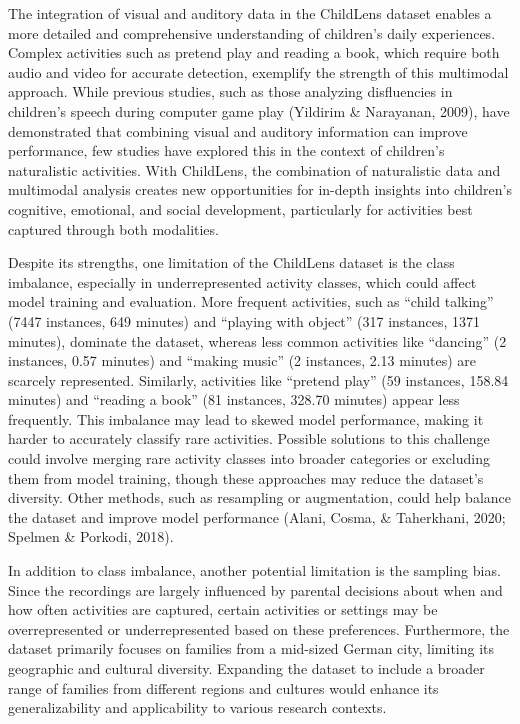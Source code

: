 \documentclass[
  man,floatsintext]{apa6}
\begin{document}
The integration of visual and auditory data in the ChildLens dataset enables a more detailed and comprehensive understanding of children's daily experiences. Complex activities such as pretend play and reading a book, which require both audio and video for accurate detection, exemplify the strength of this multimodal approach. While previous studies, such as those analyzing disfluencies in children's speech during computer game play (Yildirim \& Narayanan, 2009), have demonstrated that combining visual and auditory information can improve performance, few studies have explored this in the context of children's naturalistic activities. With ChildLens, the combination of naturalistic data and multimodal analysis creates new opportunities for in-depth insights into children's cognitive, emotional, and social development, particularly for activities best captured through both modalities.

Despite its strengths, one limitation of the ChildLens dataset is the class imbalance, especially in underrepresented activity classes, which could affect model training and evaluation. More frequent activities, such as ``child talking'' (7447 instances, 649 minutes) and ``playing with object'' (317 instances, 1371 minutes), dominate the dataset, whereas less common activities like ``dancing'' (2 instances, 0.57 minutes) and ``making music'' (2 instances, 2.13 minutes) are scarcely represented. Similarly, activities like ``pretend play'' (59 instances, 158.84 minutes) and ``reading a book'' (81 instances, 328.70 minutes) appear less frequently. This imbalance may lead to skewed model performance, making it harder to accurately classify rare activities. Possible solutions to this challenge could involve merging rare activity classes into broader categories or excluding them from model training, though these approaches may reduce the dataset's diversity. Other methods, such as resampling or augmentation, could help balance the dataset and improve model performance (Alani, Cosma, \& Taherkhani, 2020; Spelmen \& Porkodi, 2018).

In addition to class imbalance, another potential limitation is the sampling bias. Since the recordings are largely influenced by parental decisions about when and how often activities are captured, certain activities or settings may be overrepresented or underrepresented based on these preferences. Furthermore, the dataset primarily focuses on families from a mid-sized German city, limiting its geographic and cultural diversity. Expanding the dataset to include a broader range of families from different regions and cultures would enhance its generalizability and applicability to various research contexts.
\end{document}
